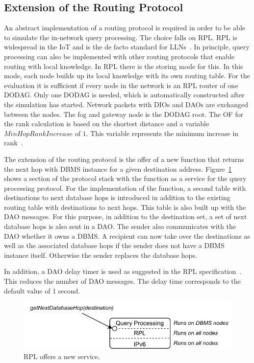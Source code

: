 \documentclass[english,version-2019-11]{uzl-thesis}
\begin{document}
\subsection{Extension of the Routing Protocol}
An abstract implementation of a routing protocol is required in order to be able to simulate the in-network query processing. The choice falls on RPL. RPL is widespread in the IoT and is the de facto standard for LLNs~\cite{RPLApplications}. In principle, query processing can also be implemented with other routing protocols that enable routing with local knowledge. In RPL there is the storing mode for this. In this mode, each node builds up its local knowledge with its own routing table. For the evaluation it is sufficient if every node in the network is an RPL router of one DODAG. Only one DODAG is needed, which is automatically constructed after the simulation has started. Network packets with DIOs and DAOs are exchanged between the nodes. The fog and gateway node is the DODAG root. The OF for the rank calculation is based on the shortest distance and a variable $MinHopRankIncrease$ of $1$. This variable represents the minimum increase in rank~\cite{rfc6550}.

The extension of the routing protocol is the offer of a new function that returns the next hop with DBMS instance for a given destination address. Figure~\ref{figure_q_processing_stack} shows a section of the protocol stack with the function as a service for the query processing protocol. For the implementation of the function, a second table with destinations to next database hops is introduced in addition to the existing routing table with destinations to next hops. This table is also built up with the DAO messages. For this purpose, in addition to the destination set, a set of next database hops is also sent in a DAO. The sender also communicates with the DAO whether it owns a DBMS. A recipient can now take over the destinations as well as the associated database hops if the sender does not have a DBMS instance itself. Otherwise the sender replaces the database hops.

In addition, a DAO delay timer is used as suggested in the RPL specification~\cite{rfc6550}. This reduces the number of DAO messages. The delay time corresponds to the default value of 1 second.
\begin{figure}[htpb]
  \centering
  \includegraphics[scale=1.1]{figure_q_processing_stack.pdf}
  \caption{RPL offers a new service.}
  \label{figure_q_processing_stack}
\end{figure}
\end{document}
